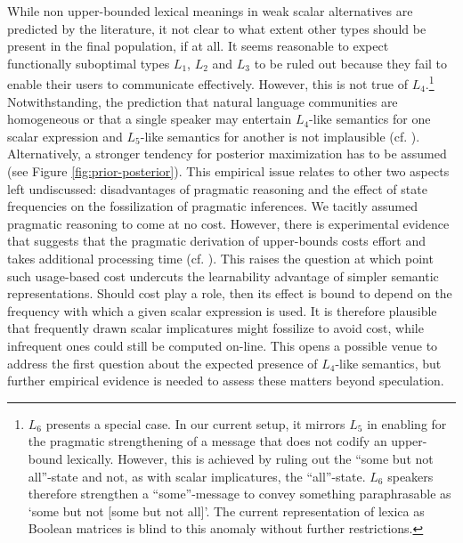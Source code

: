 \documentclass[a4paper]{article}
\begin{document}
While non upper-bounded lexical meanings in weak scalar alternatives are predicted by the literature, it not clear to what extent other types should be present in the final population, if at all. It seems reasonable to expect functionally suboptimal types $L_1$, $L_2$ and $L_3$ to be ruled out because they fail to enable their users to communicate effectively. However, this is not true of $L_4$.\footnote{$L_6$ presents a special case. In our current setup, it mirrors $L_5$ in enabling for the pragmatic strengthening of a message that does not codify an upper-bound lexically. However, this is achieved by ruling out the ``some but not all''-state and not, as with scalar implicatures, the ``all''-state. $L_6$ speakers therefore strengthen a ``some''-message to convey something paraphrasable as `some but not [some but not all]'. The current representation of lexica as Boolean matrices is blind to this anomaly without further restrictions.} Notwithstanding, the prediction that natural language communities are homogeneous or that a single speaker may entertain $L_4$-like semantics for one scalar expression and $L_5$-like semantics for another is not implausible (cf. \citealt{franke+degen:2016}). Alternatively, a stronger tendency for posterior maximization has to be assumed (see Figure \ref{fig:prior-posterior}). This empirical issue relates to other two aspects left undiscussed: disadvantages of pragmatic reasoning and the effect of state frequencies on the fossilization of pragmatic inferences. We tacitly assumed pragmatic reasoning to come at no cost. However, there is experimental evidence that suggests  that the pragmatic derivation of upper-bounds costs effort and takes additional processing time (cf. \citealt{deNeys+schaeken:2007, huang+snedeker:2009}). This raises the question at which point such usage-based cost undercuts the learnability advantage of simpler semantic representations. Should cost play a role, then its effect is bound to depend on the frequency with which a given scalar expression is used. It is therefore plausible that frequently drawn scalar implicatures might fossilize to avoid cost, while infrequent ones could still be computed on-line. This opens a possible venue to address the first question about the expected presence of $L_4$-like semantics, but further empirical evidence is needed to assess these matters beyond speculation. 
\end{document}
